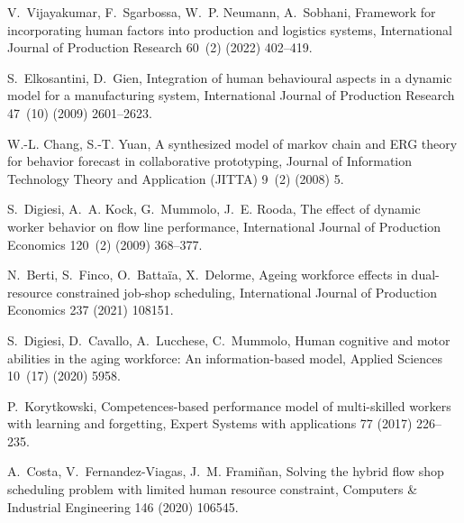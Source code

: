 \documentclass[review,12pt, 3p, times]{elsarticle}
\begin{document}
\begin{thebibliography}{00}
V.~Vijayakumar, F.~Sgarbossa, W.~P. Neumann, A.~Sobhani, Framework for
  incorporating human factors into production and logistics systems,
  International Journal of Production Research 60~(2) (2022) 402--419.

S.~Elkosantini, D.~Gien, Integration of human behavioural aspects in a dynamic
  model for a manufacturing system, International Journal of Production
  Research 47~(10) (2009) 2601--2623.

W.-L. Chang, S.-T. Yuan, A synthesized model of markov chain and {ERG} theory
  for behavior forecast in collaborative prototyping, Journal of Information
  Technology Theory and Application (JITTA) 9~(2) (2008) 5.

S.~Digiesi, A.~A. Kock, G.~Mummolo, J.~E. Rooda, {The effect of dynamic worker
  behavior on flow line performance}, International Journal of Production
  Economics 120~(2) (2009) 368--377.

N.~Berti, S.~Finco, O.~Battaïa, X.~Delorme, Ageing workforce effects in
  dual-resource constrained job-shop scheduling, International Journal of
  Production Economics 237 (2021) 108151.

S.~Digiesi, D.~Cavallo, A.~Lucchese, C.~Mummolo, Human cognitive and motor
  abilities in the aging workforce: An information-based model, Applied
  Sciences 10~(17) (2020) 5958.

P.~Korytkowski, Competences-based performance model of multi-skilled workers
  with learning and forgetting, Expert Systems with applications 77 (2017)
  226--235.

A.~Costa, V.~Fernandez-Viagas, J.~M. Frami{\~n}an, Solving the hybrid flow shop
  scheduling problem with limited human resource constraint, Computers \&
  Industrial Engineering 146 (2020) 106545.

\end{thebibliography}
\end{document}

